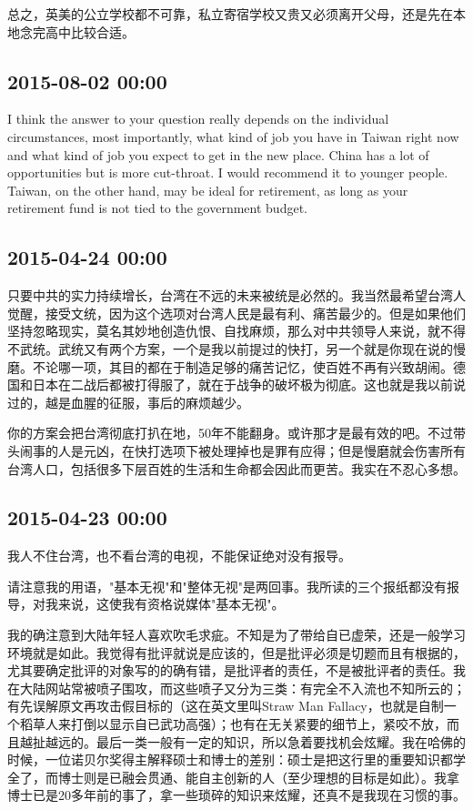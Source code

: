 \documentclass[twocolumn]{ctexart}
\begin{document}
总之，英美的公立学校都不可靠，私立寄宿学校又贵又必须离开父母，还是先在本地念完高中比较合适。\subsection*{2015-08-02 00:00}
I think the answer to your question really depends on the individual circumstances, most importantly, what kind of job you have in Taiwan right now and what kind of job you expect to get in the new place. China has a lot of opportunities but is more cut-throat. I would recommend it to younger people. Taiwan, on the other hand, may be ideal for retirement, as long as your retirement fund is not tied to the government budget.\subsection*{2015-04-24 00:00}
只要中共的实力持续增长，台湾在不远的未来被统是必然的。我当然最希望台湾人觉醒，接受文统，因为这个选项对台湾人民是最有利、痛苦最少的。但是如果他们坚持忽略现实，莫名其妙地创造仇恨、自找麻烦，那么对中共领导人来说，就不得不武统。武统又有两个方案，一个是我以前提过的快打，另一个就是你现在说的慢磨。不论哪一项，其目的都在于制造足够的痛苦记忆，使百姓不再有兴致胡闹。德国和日本在二战后都被打得服了，就在于战争的破坏极为彻底。这也就是我以前说过的，越是血腥的征服，事后的麻烦越少。

你的方案会把台湾彻底打扒在地，50年不能翻身。或许那才是最有效的吧。不过带头闹事的人是元凶，在快打选项下被处理掉也是罪有应得；但是慢磨就会伤害所有台湾人口，包括很多下层百姓的生活和生命都会因此而更苦。我实在不忍心多想。\subsection*{2015-04-23 00:00}
我人不住台湾，也不看台湾的电视，不能保证绝对没有报导。

请注意我的用语，"基本无视"和"整体无视"是两回事。我所读的三个报纸都没有报导，对我来说，这使我有资格说媒体"基本无视"。

我的确注意到大陆年轻人喜欢吹毛求疵。不知是为了带给自已虚荣，还是一般学习环境就是如此。我觉得有批评就说是应该的，但是批评必须是切题而且有根据的，尤其要确定批评的对象写的的确有错，是批评者的责任，不是被批评者的责任。我在大陆网站常被喷子围攻，而这些喷子又分为三类：有完全不入流也不知所云的；有先误解原文再攻击假目标的（这在英文里叫Straw Man Fallacy，也就是自制一个稻草人来打倒以显示自已武功高强）；也有在无关紧要的细节上，紧咬不放，而且越扯越远的。最后一类一般有一定的知识，所以急着要找机会炫耀。我在哈佛的时候，一位诺贝尔奖得主解释硕士和博士的差别：硕士是把这行里的重要知识都学全了，而博士则是已融会贯通、能自主创新的人（至少理想的目标是如此）。我拿博士已是20多年前的事了，拿一些琐碎的知识来炫耀，还真不是我现在习惯的事。
\end{document}
